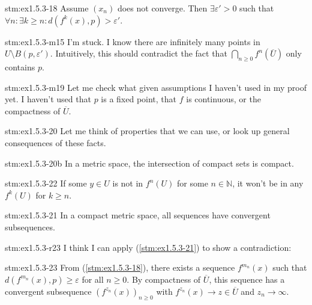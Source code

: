 \begin{statement}{stm:ex1.5.3-18}
Assume $(x_n)$ does not converge. Then $\exists \varepsilon' > 0$ such that $\forall n : \exists k \ge n : d(f^k(x), p) > \varepsilon'$.
\end{statement}

\begin{explanation}{stm:ex1.5.3-m15}
I'm stuck. I know there are infinitely many points in $U \setminus B(p, \varepsilon')$. Intuitively, this should contradict the fact that $\bigcap_{n \ge 0} f^n(\overline{U})$ only contains $p$.
\end{explanation}

\begin{explanation}{stm:ex1.5.3-m19}
Let me check what given assumptions I haven't used in my proof yet. I haven't used that $p$ is a fixed point, that $f$ is continuous, or the compactness of $\overline{U}$.
\end{explanation}

\begin{explanation}{stm:ex1.5.3-20}
Let me think of properties that we can use, or look up general consequences of these facts.
\end{explanation}

\begin{explanation}{stm:ex1.5.3-20b}
 In a metric space, the intersection of compact sets is compact.
\end{explanation}

\begin{explanation}{stm:ex1.5.3-22}
    If some $y \in U$ is not in $f^n(U)$ for some $n \in \mathbb{N}$, it won't be in any $f^k(U)$ for $k \ge n$.
\end{explanation}

\begin{explanation}{stm:ex1.5.3-21}
In a compact metric space, all sequences have convergent subsequences.
\end{explanation}

\begin{explanation}{stm:ex1.5.3-r23}
I think I can apply (\ref{stm:ex1.5.3-21}) to show a contradiction: 
\end{explanation}

\begin{statement}{stm:ex1.5.3-23}
From (\ref{stm:ex1.5.3-18}), there exists a sequence $f^{m_n}(x)$ such that $d(f^{m_n}(x), p) \ge \varepsilon$ for all $n \ge 0$. By compactness of $\overline{U}$, this sequence has a convergent subsequence $(f^{z_n}(x))_{n \ge 0}$ with $f^{z_n}(x) \to z \in \overline{U}$ and $z_n \to \infty$.
\end{statement}

